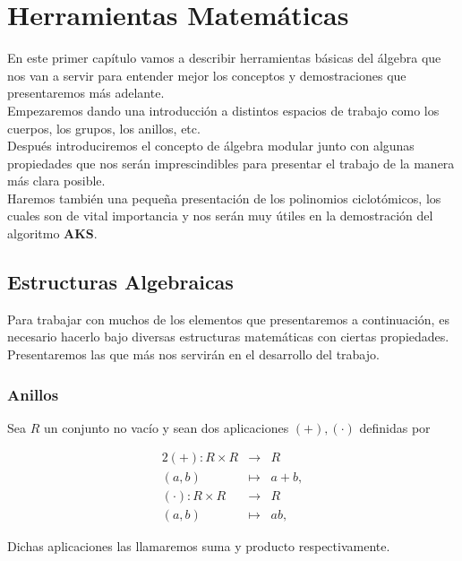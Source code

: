 \chapter{Herramientas Matemáticas}

En este primer capítulo vamos a describir herramientas básicas del álgebra que nos van a servir para entender mejor los conceptos y demostraciones que presentaremos más adelante.\\

Empezaremos dando una introducción a distintos espacios de trabajo como los cuerpos, los grupos, los anillos, etc.\\

Después introduciremos el concepto de álgebra modular junto con algunas propiedades que nos serán imprescindibles para presentar el trabajo de la manera más clara posible.\\

Haremos también una pequeña presentación de los polinomios ciclotómicos, los cuales son de vital importancia y nos serán muy útiles en la demostración del algoritmo \textbf{AKS}.

\section{Estructuras Algebraicas}

Para trabajar con muchos de los elementos que presentaremos a continuación, es necesario hacerlo bajo diversas estructuras matemáticas con ciertas propiedades.\\

Presentaremos las que más nos servirán en el desarrollo del trabajo.

\subsection{Anillos}

Sea $R$ un conjunto no vacío y sean dos aplicaciones $(+), (\cdot)$ definidas por

\begin{alignat*}{2}
	(+): R \times R & \to & R \\
	(a, b) & \mapsto & a+b, \\
	(\cdot): R \times R & \to & R \\
	(a, b) & \mapsto & ab,
\end{alignat*}

Dichas aplicaciones las llamaremos suma y producto respectivamente.


